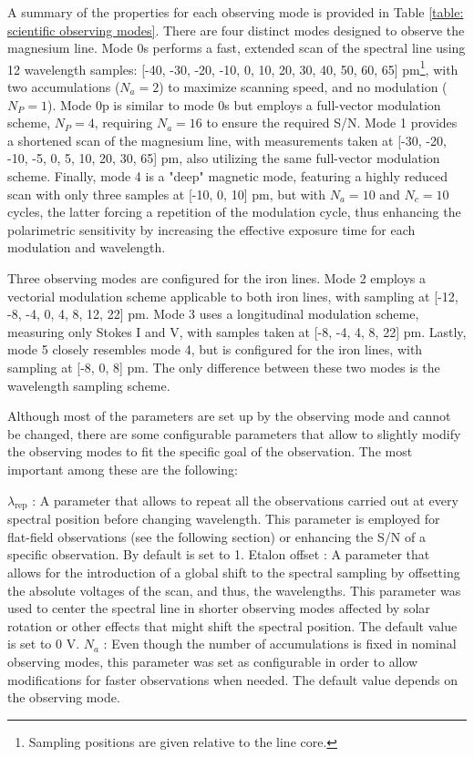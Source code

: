A summary of the properties for each observing mode is provided in Table \ref{table: scientific observing modes}. There are four distinct modes designed to observe the magnesium line. Mode 0s performs a fast, extended scan of the spectral line using 12 wavelength samples: [-40, -30, -20, -10, 0, 10, 20, 30, 40, 50, 60, 65] pm\footnote{Sampling positions are given relative to the line core.}, with two accumulations ($N_a = 2$) to maximize scanning speed, and no modulation ($N_P = 1$). Mode 0p is similar to mode 0s but employs a full-vector modulation scheme, $N_P = 4$, requiring $N_a = 16$ to ensure the required S/N. Mode 1 provides a shortened scan of the magnesium line, with measurements taken at [-30, -20, -10, -5, 0, 5, 10, 20, 30, 65] pm, also utilizing the same full-vector modulation scheme. Finally, mode 4 is a "deep" magnetic mode, featuring a highly reduced scan with only three samples at [-10, 0, 10] pm, but with $N_a = 10$ and $N_c = 10$ cycles, the latter forcing a repetition of the modulation cycle, thus enhancing the polarimetric sensitivity by increasing the effective exposure time for each modulation and wavelength.

Three observing modes are configured for the iron lines. Mode 2 employs a vectorial modulation scheme applicable to both iron lines, with sampling at [-12, -8, -4, 0, 4, 8, 12, 22] pm. Mode 3 uses a longitudinal modulation scheme, measuring only Stokes I and V, with samples taken at [-8, -4, 4, 8, 22] pm. Lastly, mode 5 closely resembles mode 4, but is configured for the iron lines, with sampling at [-8, 0, 8] pm. The only difference between these two modes is the wavelength sampling scheme.

Although most of the parameters are set up by the observing mode and cannot be changed, there are some configurable parameters that allow to slightly modify the observing modes to fit the specific goal of the observation. The most important among these are the following:

\begin{itemize}
    \Myitem $\lambda _ {\text{rep}}$ : A parameter that allows to repeat all the observations carried out at every spectral position before changing wavelength. This parameter is employed for flat-field observations (see the following section) or enhancing the S/N of a specific observation. By default is set to 1.
    \Myitem Etalon offset : A parameter that allows for the introduction of a global shift to the spectral sampling by offsetting the absolute voltages of the scan, and thus, the wavelengths. This parameter was used to center the spectral line in shorter observing modes affected by solar rotation or other effects that might shift the spectral position. The default value is set to 0 V.
    \Myitem $N_a$ : Even though the number of accumulations is fixed in nominal observing modes, this parameter was set as configurable in order to allow modifications for faster observations when needed. The  default value depends on the observing mode.  
\end{itemize}

